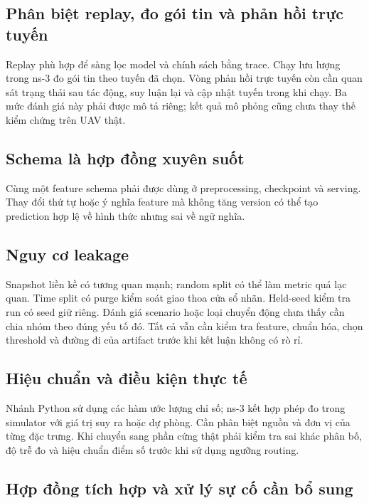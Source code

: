 \documentclass[12pt,a4paper]{article}
\begin{document}
\subsection{Phân biệt replay, đo gói tin và phản hồi trực tuyến}

Replay phù hợp để sàng lọc model và chính sách bằng trace. Chạy lưu lượng trong ns-3 đo gói tin theo tuyến đã chọn. Vòng phản hồi trực tuyến còn cần quan sát trạng thái sau tác động, suy luận lại và cập nhật tuyến trong khi chạy. Ba mức đánh giá này phải được mô tả riêng; kết quả mô phỏng cũng chưa thay thế kiểm chứng trên UAV thật.

\subsection{Schema là hợp đồng xuyên suốt}

Cùng một feature schema phải được dùng ở preprocessing, checkpoint và serving. Thay đổi thứ tự hoặc ý nghĩa feature mà không tăng version có thể tạo prediction hợp lệ về hình thức nhưng sai về ngữ nghĩa.

\subsection{Nguy cơ leakage}

Snapshot liền kề có tương quan mạnh; random split có thể làm metric quá lạc quan. Time split có purge kiểm soát giao thoa cửa sổ nhãn. Held-seed kiểm tra run có seed giữ riêng. Đánh giá scenario hoặc loại chuyển động chưa thấy cần chia nhóm theo đúng yếu tố đó. Tất cả vẫn cần kiểm tra feature, chuẩn hóa, chọn threshold và đường đi của artifact trước khi kết luận không có rò rỉ.

\subsection{Hiệu chuẩn và điều kiện thực tế}

Nhánh Python sử dụng các hàm ước lượng chỉ số; ns-3 kết hợp phép đo trong simulator với giá trị suy ra hoặc dự phòng. Cần phân biệt nguồn và đơn vị của từng đặc trưng. Khi chuyển sang phần cứng thật phải kiểm tra sai khác phân bố, độ trễ đo và hiệu chuẩn điểm số trước khi sử dụng ngưỡng routing.

\subsection{Hợp đồng tích hợp và xử lý sự cố cần bổ sung}
\end{document}
